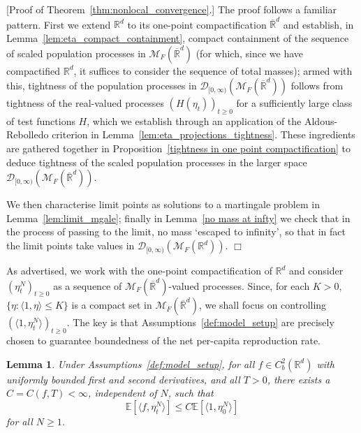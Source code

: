\documentclass[12pt]{article}
\newenvironment {proof}{{\noindent\bf Proof }}{\hfill $\Box$ \medskip}
\newtheorem{lemma}[theorem]{Lemma}
\newcommand{\IE}{\mathbb E}
\newcommand{\IR}{\mathbb R}
\newcommand{\measures}{\mathcal{M}_F(\IR^d)} %
\newcommand{\cmeasures}{\mathcal{M}_F(\overline{\IR}^d)} %
\numberwithin{equation}{section}
\begin{document}
\begin{proof}[Proof of Theorem~\ref{thm:nonlocal_convergence}.]
The proof follows a familiar pattern. First we extend $\IR^d$ 
to its one-point compactification $\overline{\IR}^d$ and 
establish, in Lemma~\ref{lem:eta_compact_containment},
compact containment of the 
sequence of scaled population
processes in $\cmeasures$ 
(for which, since we have compactified $\IR^d$,
it suffices to consider the sequence of total masses); armed with this, 
tightness of the population processes in $\mathcal{D}_{[0,\infty)}(\cmeasures)$
follows from tightness of the real-valued processes $(H(\eta_t))_{t\geq 0}$ for a sufficiently large
class of test functions $H$, which we establish through an application of the
Aldous-Rebolledo criterion in Lemma~\ref{lem:eta_projections_tightness}.
These ingredients are gathered together in 
Proposition~\ref{tightness in one point compactification}
to deduce tightness of the scaled population processes in 
the larger space $\mathcal{D}_{[0,\infty)}(\cmeasures)$.

We then characterise
limit points as solutions to a martingale problem in
Lemma~\ref{lem:limit_mgale}; finally in Lemma~\ref{no mass at infty}
we check that 
in the process of passing to the limit, no mass `escaped to infinity', so that
in fact the limit points take values in $\mathcal{D}_{[0,\infty)}(\measures)$.
\end{proof}



As advertised, we work with the one-point compactification of $\IR^d$ and
consider $(\eta^N_t)_{t\geq 0}$ as a sequence of 
$\cmeasures$-valued processes. Since, for each $K>0$,
$\{\eta: \langle 1,\eta\rangle\leq K\}$
is a compact set in $\cmeasures$, we shall focus on 
controlling $(\langle 1,\eta^N_t\rangle)_{t\geq 0}$.
The key is that Assumptions~\ref{def:model_setup}
are precisely chosen to guarantee boundedness
of the net per-capita reproduction rate.

\begin{lemma}
    \label{lem:eta_f_bound}
    Under Assumptions~\ref{def:model_setup},
    for all $f \in C^2_b(\IR^d)$ with uniformly bounded first and 
	second derivatives, and all $T>0$, there exists a $C=C(f,T) < \infty$, 
	independent of $N$,
    such that
    \begin{equation}
\label{eta_f_bound}
        \IE[\langle f, \eta^N_t \rangle]
        \le
	    C\IE[\langle 1, \eta^N_0 \rangle]
    \end{equation}
    for all $N \geq 1$.
\end{lemma}
\end{document}
